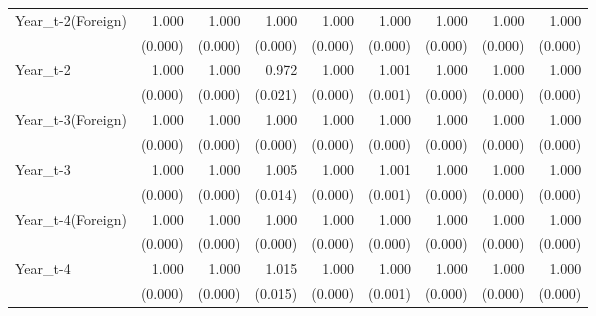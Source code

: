 \begin{table}[htbp]
\begin{tabular}{l*{8}{D{.}{.}{-1}}}
Year\_t-2(Foreign)&       1.000\sym{***}&       1.000\sym{*}  &       1.000         &       1.000         &       1.000         &       1.000\sym{\%}  &       1.000         &       1.000         \\
            &     (0.000)         &     (0.000)         &     (0.000)         &     (0.000)         &     (0.000)         &     (0.000)         &     (0.000)         &     (0.000)         \\
Year\_t-2    &       1.000         &       1.000         &       0.972         &       1.000\sym{**} &       1.001         &       1.000         &       1.000         &       1.000         \\
            &     (0.000)         &     (0.000)         &     (0.021)         &     (0.000)         &     (0.001)         &     (0.000)         &     (0.000)         &     (0.000)         \\
Year\_t-3(Foreign)&       1.000\sym{**} &       1.000         &       1.000         &       1.000         &       1.000         &       1.000         &       1.000         &       1.000\sym{\%}  \\
            &     (0.000)         &     (0.000)         &     (0.000)         &     (0.000)         &     (0.000)         &     (0.000)         &     (0.000)         &     (0.000)         \\
Year\_t-3    &       1.000\sym{**} &       1.000\sym{**} &       1.005         &       1.000         &       1.001         &       1.000         &       1.000\sym{*}  &       1.000         \\
            &     (0.000)         &     (0.000)         &     (0.014)         &     (0.000)         &     (0.001)         &     (0.000)         &     (0.000)         &     (0.000)         \\
Year\_t-4(Foreign)&       1.000\sym{***}&       1.000\sym{***}&       1.000\sym{**} &       1.000         &       1.000         &       1.000         &       1.000         &       1.000         \\
            &     (0.000)         &     (0.000)         &     (0.000)         &     (0.000)         &     (0.000)         &     (0.000)         &     (0.000)         &     (0.000)         \\
Year\_t-4    &       1.000         &       1.000         &       1.015         &       1.000         &       1.000         &       1.000         &       1.000\sym{*}  &       1.000\sym{**} \\
            &     (0.000)         &     (0.000)         &     (0.015)         &     (0.000)         &     (0.001)         &     (0.000)         &     (0.000)         &     (0.000)         \\

\end{tabular}
\end{table}
